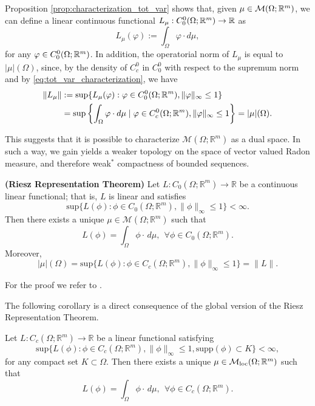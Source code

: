 Proposition \ref{prop:characterization_tot_var} shows that, given $\mu \in \mathcal{M}(\Omega;\mathbb{R}^m)$, we can define a linear continuous functional $L_{\mu} : C^{0}_{0}(\Omega; \mathbb{R}^{m}) \to \mathbb{R}$ as
\begin{equation*}
L_{\mu}(\varphi) := \int_{\Omega} \varphi \cdot d \mu,
\end{equation*}
for any $\varphi \in C^{0}_{0}(\Omega; \mathbb{R}^{m})$. In addition, the operatorial norm of $L_{\mu}$ is equal to $|\mu|(\Omega)$, since, by the density of $C^{0}_{c}$ in $C^{0}_{0}$ with respect to the supremum norm and by \eqref{eq:tot_var_characterization}, we have
\begin{align*}
\|L_{\mu}\| & := \sup\{ L_{\mu}(\varphi) : \varphi \in C^{0}_{0}(\Omega; \mathbb{R}^{m}), \|\varphi\|_{\infty} \le 1 \} \\
& = \sup\left\{ \int_\Omega \varphi \cdot d\mu \mid 
\varphi \in C^0_c(\Omega;\mathbb{R}^m), \|\varphi\|_\infty \leq 1\right\} = |\mu|(\Omega).
\end{align*}

This suggests that it is possible to characterize $\mathcal{M}(\Omega; \mathbb{R}^{m})$ as a dual space. In such a way, we gain yields a weaker topology on the space of vector valued Radon measure, and therefore weak$^{*}$ compactness of bounded sequences. 

\begin{theorem} \label{Rieszreprfin} {\bf (Riesz Representation Theorem)} 
Let $L: C_{0} (\Omega; \mathbb{R}^{m}) \to \mathbb{R}$ be a continuous linear functional; that is, $L$ is linear and satisfies
\[ \mathrm{sup} \{ L(\phi) : \phi \in C_{0} (\Omega; \mathbb{R}^{m}), \|\phi\|_{\infty} \le 1 \} < \infty. \]
Then there exists a unique $\mu \in \mathcal{M}(\Omega; \mathbb{R}^{m})$ such that
\[ L(\phi) = \int_{\Omega} \phi \cdot \, d\mu, \  \ \forall \phi \in C_{0}(\Omega; \mathbb{R}^{m}).  \]
Moreover, 
\[ |\mu|(\Omega) = \mathrm{sup}\{ L(\phi) : \phi \in C_{c}(\Omega; \mathbb{R}^{m}), \|\phi\|_{\infty} \le 1\} = \|L\|. \]
\end{theorem}
For the proof we refer to \cite[Theorem 1.54]{AFP}.

The following corollary is a direct consequence of the global version of the Riesz Representation Theorem.

\begin{corollary} \label{Rieszrepr} Let $L: C_{c} (\Omega; \mathbb{R}^{m}) \to \mathbb{R}$ be a linear functional satisfying
\[ \mathrm{sup} \{ L(\phi) : \phi \in C_{c} (\Omega; \mathbb{R}^{m}), \|\phi\|_{\infty} \le 1, \mathrm{supp}(\phi) \subset K \} < \infty, \]
for any compact set $K \subset \Omega$.
Then there exists a unique $\mu \in \mathcal{M}_{\rm loc}(\Omega; \mathbb{R}^{m})$ such that
\[ L(\phi) = \int_{\Omega} \phi \cdot \, d\mu, \  \ \forall \phi \in C_{c}(\Omega; \mathbb{R}^{m}).  \]
\end{corollary}

